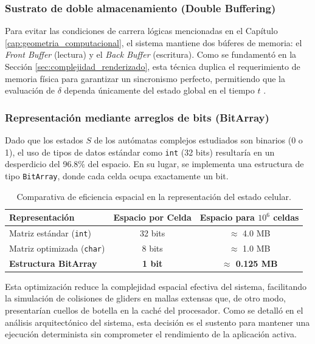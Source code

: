 \subsubsection{Sustrato de doble almacenamiento (Double Buffering)}

Para evitar las condiciones de carrera lógicas mencionadas en el Capítulo \ref{cap:geometria_computacional}, el sistema mantiene dos búferes de memoria: el \textit{Front Buffer} (lectura) y el \textit{Back Buffer} (escritura). Como se fundamentó en la Sección \ref{sec:complejidad_renderizado}, esta técnica duplica el requerimiento de memoria física para garantizar un sincronismo perfecto, permitiendo que la evaluación de $\delta$ dependa únicamente del estado global en el tiempo $t$ \cite{Toffoli1987}.

\subsubsection{Representación mediante arreglos de bits (BitArray)}

Dado que los estados $S$ de los autómatas complejos estudiados son binarios (0 o 1), el uso de tipos de datos estándar como \texttt{int} (32 bits) resultaría en un desperdicio del 96.8\% del espacio. En su lugar, se implementa una estructura de tipo \texttt{BitArray}, donde cada celda ocupa exactamente un bit. 

\begin{table}[ht]
\centering
\begin{tabular}{|l|c|c|}
\hline
\textbf{Representación} & \textbf{Espacio por Celda} & \textbf{Espacio para $10^6$ celdas} \\ \hline
Matriz estándar (\texttt{int}) & 32 bits & $\approx$ 4.0 MB \\ \hline
Matriz optimizada (\texttt{char}) & 8 bits & $\approx$ 1.0 MB \\ \hline
\textbf{Estructura BitArray} & \textbf{1 bit} & \textbf{$\approx$ 0.125 MB} \\ \hline
\end{tabular}
\caption{Comparativa de eficiencia espacial en la representación del estado celular.}
\label{tab:eficiencia_memoria}
\end{table}

Esta optimización reduce la complejidad espacial efectiva del sistema, facilitando la simulación de colisiones de gliders en mallas extensas que, de otro modo, presentarían cuellos de botella en la caché del procesador. Como se detalló en el análisis arquitectónico del sistema, esta decisión es el sustento para mantener una ejecución determinista sin comprometer el rendimiento de la aplicación activa.

